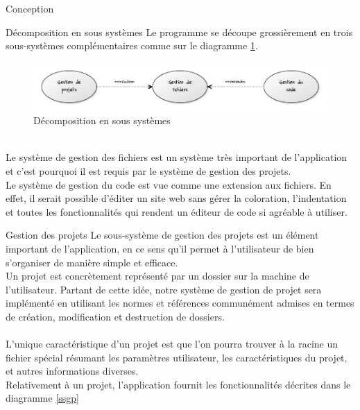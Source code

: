\documentclass[a4paper, 12pt]{report}
\begin{document}
	\begin{part}{Conception}
		\begin{chapter}{Décomposition en sous systèmes}
			Le programme se découpe grossièrement en trois sous-systèmes complémentaires comme sur le diagramme \ref{dess}.
			\begin{figure}[h]
				\begin{center}
					\includegraphics[width=17cm]{images/DecompositionSousSystemes.jpg}
					\caption{Décomposition en sous systèmes}
					\label{dess}
				\end{center}
			\end{figure}~\\
			Le système de gestion des fichiers est un système très important de l'application et c'est pourquoi il est requis
			par le système de gestion des projets.\\
			Le système de gestion du code est vue comme une extension aux fichiers. En effet, il serait possible d'éditer un
			site web sans gérer la coloration, l'indentation et toutes les fonctionnalités qui rendent un éditeur de code si agréable à utiliser.
			\begin{section}{Gestion des projets}
				Le sous-système de gestion des projets est un élément important de l'application, en ce sens qu'il permet à l'utilisateur
				de bien s'organiser de manière simple et efficace.\\
				Un projet est concrètement représenté par un dossier sur la machine de l'utilisateur. Partant de cette idée, notre système
				de gestion de projet sera implémenté en utilisant les normes et références communément admises en termes de création,
				modification et destruction de dossiers.\\~\\
				L'unique caractéristique d'un projet est que l'on pourra trouver à la racine un fichier spécial résumant les paramètres utilisateur,
				les caractéristiques du projet, et autres informations diverses.\\
				Relativement à un projet, l'application fournit les fonctionnalités décrites dans le diagramme \ref{ssgp}
				\begin{figure}[ht]
					\begin{center}

\end{center}
\end{figure}
\end{section}
\end{chapter}
\end{part}
\end{document}
